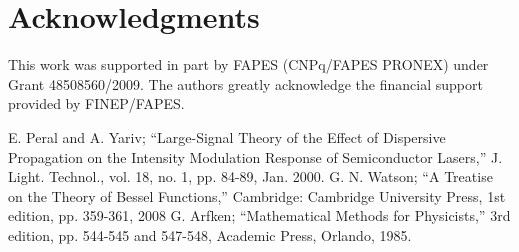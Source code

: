 \documentclass[journal]{IEEEtran}
\begin{document}
%

\section*{Acknowledgments}

This work was supported in part by FAPES (CNPq/FAPES PRONEX) under Grant 48508560/2009. The authors greatly acknowledge the financial support provided by FINEP/FAPES.


\begin{thebibliography}{1}
E. Peral and A. Yariv; ``Large-Signal Theory of the Effect of Dispersive Propagation on the Intensity Modulation Response of Semiconductor Lasers,'' J. Light. Technol., vol. 18, no. 1, pp. 84-89, Jan. 2000.
G. N. Watson; ``A Treatise on the Theory of Bessel Functions,'' Cambridge: Cambridge University Press, 1st edition, pp. 359-361, 2008
G. Arfken; ``Mathematical Methods for Physicists,'' 3rd edition, pp. 544-545 and 547-548, Academic Press, Orlando, 1985.
\end{thebibliography}
\end{document}
